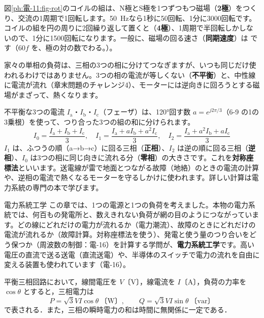 図\ref{ph:電-11:fig-rot}のコイルの組は、N極とS極を1つずつもつ磁場（\textbf{2極}）をつくり、交流の1周期で1回転します。\qty{50}{Hz}なら1秒に50回転、1分に3000回転です。コイルの組を円の周りに2回繰り返して置くと（\textbf{4極}）、1周期で半回転しかしないので、1分に1500回転になります。一般に、磁場の回る速さ（\textbf{同期速度}）は
です（$60f$ を、極の対の数でわる。）。

\label{ph:電-11:sec10}
家々の単相の負荷は、三相の3つの相に分けてつなぎますが、いつも同じだけ使われるわけではありません。3つの相の電流が等しくない（\textbf{不平衡}）と、中性線に電流が流れ（章末問題のチャレンジ4）、モーターには逆向きに回ろうとする磁場がまざって、熱くなります。

不平衡な3つの電流 $I_{\mathrm a}$・$I_{\mathrm b}$・$I_{\mathrm c}$（フェーザ）は、120°回す数 $a=e^{j2\pi/3}$（6-9 の1の3乗根）を使って、つり合った3つの組の和に分けられます。
\[I_0=\frac{I_{\mathrm a}+I_{\mathrm b}+I_{\mathrm c}}{3},\quad I_1=\frac{I_{\mathrm a}+aI_{\mathrm b}+a^2I_{\mathrm c}}{3},\quad I_2=\frac{I_{\mathrm a}+a^2I_{\mathrm b}+aI_{\mathrm c}}{3}\]
$I_1$ は、ふつうの順（a→b→c）に回る三相（\textbf{正相}）、$I_2$ は逆の順に回る三相（\textbf{逆相}）、$I_0$ は3つの相に同じ向きに流れる分（\textbf{零相}）の大きさです。これを\textbf{対称座標法}といいます。送電線が雷で地面とつながる故障（地絡）のときの電流の計算や、逆相の電流で熱くなるモーターを守るしかけに使われます。詳しい計算は電力系統の専門の本で学びます。

\begin{phsaki}{電力系統工学}
この章では、1つの電源と1つの負荷を考えました。本物の電力系統では、何百もの発電所と、数えきれない負荷が網の目のようにつながっています。どの線にどれだけの電力が流れるか（電力潮流）、故障のときにどれだけの電流が流れるか（故障計算。対称座標法を使う）、発電と使う量のつり合いをどう保つか（周波数の制御：電-16）を計算する学問が、\textbf{電力系統工学}です。高い電圧の直流で送る送電（直流送電）や、半導体のスイッチで電力の流れを自由に変える装置も使われています（電-16）。
\end{phsaki}

\begin{senmonsho}[電力工学の教科書ふうの書き方]
\begin{bkhonbun}
平衡三相回路において，線間電圧を $V$〔V〕，線電流を $I$〔A〕，負荷の力率を $\cos\theta$ とすると，三相電力は
\[P=\sqrt3VI\cos\theta\ \text{〔W〕},\qquad Q=\sqrt3VI\sin\theta\ \text{〔var〕}\]
で表される．また，三相の瞬時電力の和は時間に無関係に一定である．
\end{bkhonbun}
\end{senmonsho}

